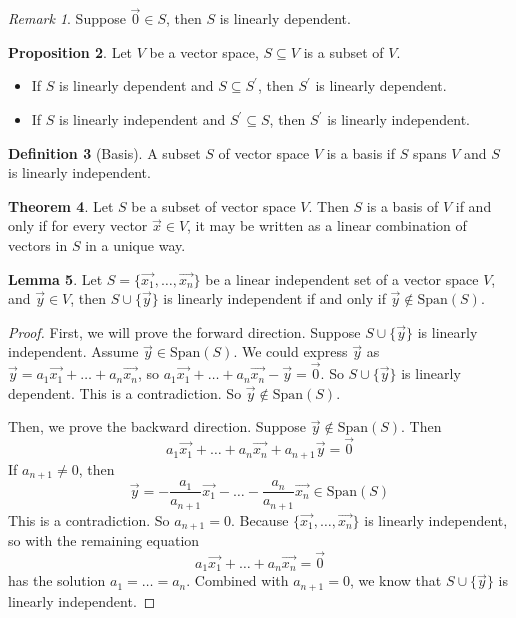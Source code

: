 \documentclass{article}
\theoremstyle{definition}
\newtheorem{theorem}{Theorem}[section]
\newtheorem{proposition}[theorem]{Proposition}
\newtheorem{lemma}[theorem]{Lemma}
\newtheorem{definition}[theorem]{Definition}
\theoremstyle{remark}
\newtheorem{remark}[theorem]{Remark}
\begin{document}
\begin{remark}
    Suppose $\vec{0}\in S$, then $S$ is linearly dependent.
\end{remark}

\begin{proposition}
    Let $V$ be a vector space, $S\subseteq V$ is a subset of $V$.
    
    \begin{itemize}
        \item If $S$ is linearly dependent and $S\subseteq S^{'}$, then $S^{'}$ is linearly dependent.
        \item If $S$ is linearly independent and $S^{'}\subseteq S$, then $S^{'}$ is linearly independent.
    \end{itemize}
\end{proposition}

\begin{definition}[Basis]
    A subset $S$ of vector space $V$ is a basis if $S$ spans $V$ and $S$ is linearly independent.
\end{definition}

\begin{theorem}
    Let $S$ be a subset of vector space $V$. Then $S$ is a basis of $V$ if and only if for every vector $\vec{x}\in V$, it may be written as a linear combination of vectors in $S$ in a unique way.
\end{theorem}

\begin{lemma}
    Let $S=\{\vec{x_1},\dots,\vec{x_n}\}$ be a linear independent set of a vector space $V$, and $\vec{y}\in V$, then $S\cup\{\vec{y}\}$ is linearly independent if and only if $\vec{y}\notin \text{Span}(S)$.
\end{lemma}

\begin{proof}
    First, we will prove the forward direction.
    Suppose $S\cup \{\vec{y}\}$ is linearly independent.
    Assume $\vec{y}\in \text{Span}(S)$. We could express $\vec{y}$ as $\vec{y}=a_1\vec{x_1}+\dots+a_n\vec{x_n}$, so $a_1\vec{x_1}+\dots+a_n\vec{x_n}-\vec{y}=\vec{0}$. So $S\cup \{\vec{y}\}$ is linearly dependent. 
    This is a contradiction.
    So $\vec{y}\notin \text{Span}(S)$.

    Then, we prove the backward direction.
    Suppose $\vec{y}\notin \text{Span}(S)$.
    Then 
    \[
    a_1\vec{x_1}+\dots+a_n\vec{x_n}+a_{n+1}\vec{y}=\vec{0}
    \]
    If $a_{n+1}\neq0$, then
    \[
    \vec{y}=-\frac{a_1}{a_{n+1}}\vec{x_1}-\dots -\frac{a_n}{a_{n+1}}\vec{x_n} \in \text{Span}(S)
    \]
    This is a contradiction. So $a_{n+1}=0$.
    Because $\{\vec{x_1},\dots,\vec{x_n}\}$ is linearly independent, so with the remaining equation
    \[
    a_1\vec{x_1}+\dots+a_n\vec{x_n}=\vec{0}
    \]
    has the solution $a_1=\dots =a_{n}$. Combined with $a_{n+1}=0$, we know that $S\cup \{\vec{y}\}$ is linearly independent.
\end{proof}
\end{document}
